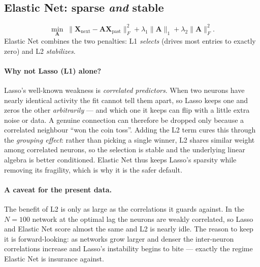 \documentclass[11pt,a4paper]{article}
\newcommand{\Amat}{\mathbf{A}}
\newcommand{\Xp}{\mathbf{X}_{\text{past}}}
\newcommand{\Xn}{\mathbf{X}_{\text{next}}}
\begin{document}
\subsection{Elastic Net: sparse \emph{and} stable}
\begin{equation}
\min_{\Amat}\;\|\Xn-\Amat\Xp\|_F^2 + \lambda_1\|\Amat\|_1 + \lambda_2\|\Amat\|_F^2 .
\end{equation}
Elastic Net combines the two penalties: L1 \emph{selects} (drives most entries to
exactly zero) and L2 \emph{stabilizes}.

\paragraph{Why not Lasso (L1) alone?}
Lasso's well-known weakness is \emph{correlated predictors}. When two neurons have
nearly identical activity the fit cannot tell them apart, so Lasso keeps one and
zeros the other \emph{arbitrarily} --- and which one it keeps can flip with a
little extra noise or data. A genuine connection can therefore be dropped only
because a correlated neighbour ``won the coin toss''. Adding the L2 term cures
this through the \emph{grouping effect}: rather than picking a single winner, L2
shares similar weight among correlated neurons, so the selection is stable and the
underlying linear algebra is better conditioned. Elastic Net thus keeps Lasso's
sparsity while removing its fragility, which is why it is the safer default.

\paragraph{A caveat for the present data.}
The benefit of L2 is only as large as the correlations it guards against. In the
$N=100$ network at the optimal lag the neurons are weakly correlated, so Lasso and
Elastic Net score almost the same and L2 is nearly idle. The reason to keep it is
forward-looking: as networks grow larger and denser the inter-neuron correlations
increase and Lasso's instability begins to bite --- exactly the regime Elastic Net
is insurance against.
\end{document}
